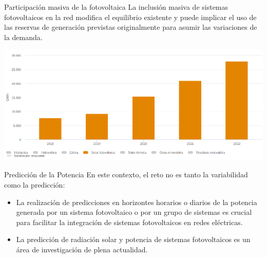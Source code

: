 \documentclass[aspectratio=169, usenames,svgnames,dvipsnames]{beamer}
\begin{document}
\begin{frame}[label={sec:orgfbba471}]{Participación masiva de la fotovoltaica}
La \alert{inclusión masiva} de sistemas fotovoltaicos en la red \alert{modifica el
equilibrio} existente y puede implicar el uso de las reservas de
generación previstas originalmente para asumir las variaciones de la
demanda.

\begin{center}
\includegraphics[height=0.6\textheight]{../figs/EvolucionGeneracionFV_REE.png}
\end{center}
\end{frame}


\begin{frame}[label={sec:orga14890d}]{Predicción de la Potencia}
En este contexto, el reto no es tanto la variabilidad como la
\alert{predicción}:

\begin{itemize}
\item La realización de predicciones en horizontes horarios o diarios de
la potencia generada por un sistema fotovoltaico o por un grupo de
sistemas es crucial para facilitar la integración de sistemas
fotovoltaicos en redes eléctricas.

\item La predicción de radiación solar y potencia de sistemas
fotovoltaicos es un área de investigación de plena actualidad.
\end{itemize}
\end{frame}
\end{document}
